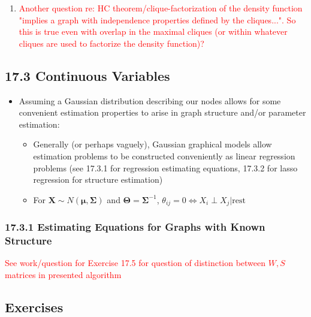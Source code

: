 \documentclass[11pt]{article}
\begin{document}
\begin{enumerate}
    \item \textcolor{red}{Another question re: HC theorem/clique-factorization of the density function "implies a graph with independence properties defined by the cliques...". So this is true even with overlap in the maximal cliques (or within whatever cliques are used to factorize the density function)? }
        
    
\end{enumerate}

\subsection*{17.3 Continuous Variables}

\begin{itemize}
    \item Assuming a Gaussian distribution describing our nodes allows for some convenient estimation properties to arise in graph structure and/or parameter estimation:
    \begin{itemize}
        \item Generally (or perhaps vaguely), Gaussian graphical models allow estimation problems to be constructed conveniently as linear regression problems (see 17.3.1 for regression estimating equations, 17.3.2 for lasso regression for structure estimation)
        \item For $\mathbf{X} \sim N(\boldsymbol{\mu}, \boldsymbol\Sigma)$ and $\boldsymbol\Theta = \boldsymbol\Sigma^{-1}$, $\theta_{ij}=0 \Leftrightarrow X_i \perp X_j | \text{rest}$
    \end{itemize}
\end{itemize}

\subsubsection{17.3.1 Estimating Equations for Graphs with Known Structure}

\textcolor{red}{See work/question for Exercise 17.5 for question of distinction between $W, S$ matrices in presented algorithm}

\newpage 

\subsection*{Exercises}
\end{document}
